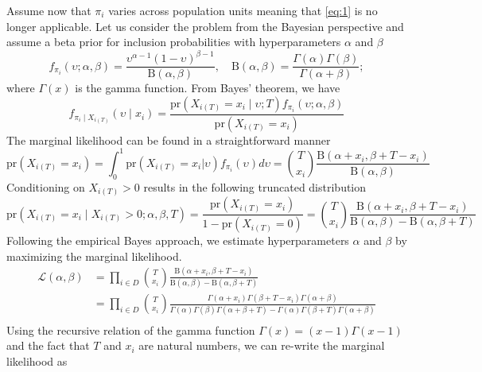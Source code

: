 \documentclass[manuscript]{biometrika}
\begin{document}
Assume now that $\pi_i$ varies across population units meaning that \eqref{eq:1} is no longer applicable. Let us consider the problem from the Bayesian perspective and assume a beta prior for inclusion probabilities with hyperparameters $\alpha$ and $\beta$
\begin{equation*}
f_{\pi_i}(\upsilon; \alpha, \beta) = \frac{\upsilon^{\alpha - 1}(1 - \upsilon)^{\beta - 1}}{\mathrm{B}(\alpha, \beta)}, \quad \mathrm{B}(\alpha, \beta) = \frac{\Gamma(\alpha)\Gamma(\beta)}{\Gamma(\alpha + \beta)};
\end{equation*}
where $\Gamma(x)$ is the gamma function. From Bayes' theorem, we have
\begin{equation*}
f_{\pi_i \mid X_{i(T)}} (\upsilon \mid x_i) = \frac{\text{pr}(X_{i(T)} = x_i \mid \upsilon; T) f_{\pi_i}(\upsilon; \alpha, \beta)}{\text{pr}(X_{i(T)} = x_i)}
\end{equation*}
The marginal likelihood can be found in a straightforward manner
\begin{equation*}
\text{pr}(X_{i(T)} = x_i) = \int_0^1 \text{pr}(X_{i(T)} = x_i | \upsilon)f_{\pi_i}(\upsilon)d\upsilon = \binom{T}{x_i} \frac{\mathrm{B}(\alpha + x_i, \beta + T - x_i)}{\mathrm{B}(\alpha, \beta)}
\end{equation*}
Conditioning on $X_{i(T)} > 0$ results in the following truncated distribution
\begin{equation*}
\text{pr}(X_{i(T)} = x_i \mid X_{i(T)} > 0; \alpha, \beta, T) = \frac{\text{pr}(X_{i(T)} = x_i)}{1 - \text{pr}(X_{i(T)} = 0)} = \binom{T}{x_i} \frac{\mathrm{B}(\alpha + x_i, \beta + T - x_i)}{\mathrm{B}(\alpha, \beta) - \mathrm{B}(\alpha, \beta + T)}
\end{equation*}
Following the empirical Bayes approach, we estimate hyperparameters $\alpha$ and $\beta$ by maximizing the marginal likelihood.
\begin{align*}
    \mathcal{L}(\alpha, \beta) &= \prod_{i \in D} \binom{T}{x_i} \frac{\mathrm{B}(\alpha + x_i, \beta + T - x_i)}{\mathrm{B}(\alpha, \beta) - \mathrm{B}(\alpha, \beta + T)} \\
    &= \prod_{i \in D} \binom{T}{x_i} \frac{\Gamma(\alpha + x_i)\Gamma(\beta + T - x_i)\Gamma(\alpha + \beta)}{\Gamma(\alpha)\Gamma(\beta)\Gamma(\alpha + \beta + T) - \Gamma(\alpha)\Gamma(\beta + T)\Gamma(\alpha + \beta)} \\
\end{align*}
Using the recursive relation of the gamma function $\Gamma(x) = (x - 1)\Gamma(x - 1)$ and the fact that $T$ and $x_i$ are natural numbers, we can re-write the marginal likelihood as
\end{document}
